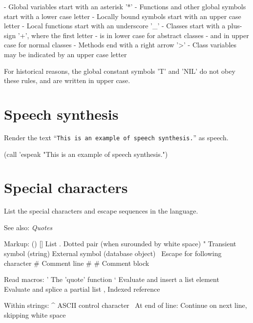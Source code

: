 \begin{itemize}
\begin{wideverbatim}
- Global variables start with an asterisk '*'
- Functions and other global symbols start with a lower case letter
- Locally bound symbols start with an upper case letter
- Local functions start with an underscore '_'
- Classes start with a plus-sign '+', where the first letter
   - is in lower case for abstract classes
   - and in upper case for normal classes
- Methods end with a right arrow '>'
- Class variables may be indicated by an upper case letter

For historical reasons, the global constant symbols 'T' and 'NIL' do not obey
these rules, and are written in upper case.

\end{wideverbatim}

\pagebreak{}
\section*{Speech synthesis}

Render the text ``\texttt{This is an example of speech synthesis.}''
as speech.

\begin{wideverbatim}

(call 'espeak "This is an example of speech synthesis.")

\end{wideverbatim}

\pagebreak{}
\section*{Special characters}

List the special characters and escape sequences in the language.

See also: \emph{Quotes}

\begin{wideverbatim}

Markup:
   () []    List
   .        Dotted pair (when surounded by white space)
   "        Transient symbol (string)
   {}       External symbol (database object)
   \        Escape for following character
   #        Comment line
   #{ }#    Comment block


Read macros:
   '        The 'quote' function
   `        Evaluate and insert a list element
   ~        Evaluate and splice a partial list
   ,        Indexed reference

Within strings:
   ^        ASCII control character
   \        At end of line: Continue on next line, skipping white space


\end{wideverbatim}
\end{itemize}
